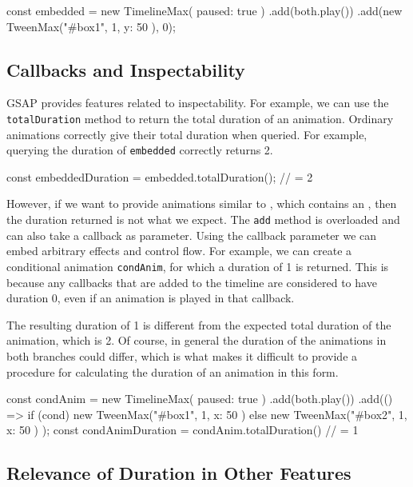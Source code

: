 \begin{js}
const embedded = new TimelineMax({ paused: true })
  .add(both.play())
  .add(new TweenMax("#box1", 1, { y: 50 }), 0);
\end{js}

\subsection{Callbacks and Inspectability}

GSAP provides features related to inspectability. For example, we can use the
\texttt{totalDuration} method to return the total duration of an animation.
Ordinary animations correctly give their total duration when queried.
For example, querying the duration of \texttt{embedded} correctly returns 2.

\begin{js}
const embeddedDuration = embedded.totalDuration(); // = 2
\end{js}

However, if we want to provide animations similar to , which contains an , then the duration returned is not what we expect. The \texttt{add} method is overloaded and can also take a callback as parameter. Using the callback parameter we can embed arbitrary effects and control flow. For example, we can create a conditional animation \texttt{condAnim}, for which a duration of 1 is returned. This is because any callbacks that are added to the timeline are considered to have duration 0, even if an animation is played in that callback.

The resulting duration of 1 is different from the expected total duration of the animation, which is 2. Of course, in general the duration of the animations in both branches could differ, which is what makes it difficult to provide a procedure for calculating the duration of an animation in this form.

\begin{js}
const condAnim = new TimelineMax({ paused: true })
  .add(both.play())
  .add(() => { if (cond) { new TweenMax("#box1", 1, { x: 50 }) }
               else { new TweenMax("#box2", 1, { x: 50 }) } });
const condAnimDuration = condAnim.totalDuration() // = 1
\end{js}

\subsection{Relevance of Duration in Other Features}


